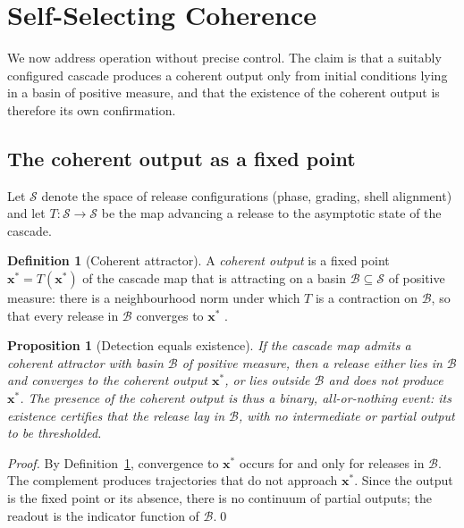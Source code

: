 \documentclass[twocolumn,10pt,a4paper]{article}
\theoremstyle{thmstyle}
\newtheorem{proposition}[theorem]{Proposition}
\theoremstyle{definition}
\newtheorem{definition}[theorem]{Definition}
\theoremstyle{remark}
\newcommand{\xstar}{\mathbf{x}^{\ast}}
\begin{document}
\section{Self-Selecting Coherence}
\label{sec:selection}

We now address operation without precise control. The claim is that a
suitably configured cascade produces a coherent output only from initial
conditions lying in a basin of positive measure, and that the existence of
the coherent output is therefore its own confirmation.

\subsection{The coherent output as a fixed point}

Let $\mathcal{S}$ denote the space of release configurations (phase, grading,
shell alignment) and let $T:\mathcal{S}\to\mathcal{S}$ be the map advancing a
release to the asymptotic state of the cascade.

\begin{definition}[Coherent attractor]
\label{def:attractor}
A \emph{coherent output} is a fixed point $\xstar=T(\xstar)$ of the cascade
map that is attracting on a basin $\mathcal{B}\subseteq\mathcal{S}$ of
positive measure: there is a neighbourhood norm under which $T$ is a
contraction on $\mathcal{B}$, so that every release in $\mathcal{B}$ converges
to $\xstar$ \citep{banach1922}.
\end{definition}

\begin{proposition}[Detection equals existence]
\label{prop:detection}
If the cascade map admits a coherent attractor with basin $\mathcal{B}$ of
positive measure, then a release either lies in $\mathcal{B}$ and converges to
the coherent output $\xstar$, or lies outside $\mathcal{B}$ and does not
produce $\xstar$. The presence of the coherent output is thus a binary,
all-or-nothing event: its existence certifies that the release lay in
$\mathcal{B}$, with no intermediate or partial output to be thresholded.
\end{proposition}

\begin{proof}
By Definition~\ref{def:attractor}, convergence to $\xstar$ occurs for and only
for releases in $\mathcal{B}$. The complement produces trajectories that do
not approach $\xstar$. Since the output is the fixed point or its absence,
there is no continuum of partial outputs; the readout is the indicator
function of $\mathcal{B}$.\qed
\end{proof}
\end{document}
